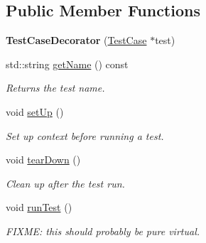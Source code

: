 \subsection*{Public Member Functions}
\begin{DoxyCompactItemize}
\item 
{\bfseries Test\+Case\+Decorator} (\hyperlink{class_test_case}{Test\+Case} $\ast$test)\hypertarget{class_test_case_decorator_ad324bf1dd0d660bae3eb5be8056e49e2}{}\label{class_test_case_decorator_ad324bf1dd0d660bae3eb5be8056e49e2}

\item 
std\+::string \hyperlink{class_test_case_decorator_a5214bb812414958d39f084e09c8af207}{get\+Name} () const 
\begin{DoxyCompactList}\small\item\em Returns the test name. \end{DoxyCompactList}\item 
void \hyperlink{class_test_case_decorator_ae379c8f3e6d411d8a5da57094c08a623}{set\+Up} ()\hypertarget{class_test_case_decorator_ae379c8f3e6d411d8a5da57094c08a623}{}\label{class_test_case_decorator_ae379c8f3e6d411d8a5da57094c08a623}

\begin{DoxyCompactList}\small\item\em Set up context before running a test. \end{DoxyCompactList}\item 
void \hyperlink{class_test_case_decorator_adc3ee82fb758f39b5781624090af449d}{tear\+Down} ()\hypertarget{class_test_case_decorator_adc3ee82fb758f39b5781624090af449d}{}\label{class_test_case_decorator_adc3ee82fb758f39b5781624090af449d}

\begin{DoxyCompactList}\small\item\em Clean up after the test run. \end{DoxyCompactList}\item 
void \hyperlink{class_test_case_decorator_ad083ca55ff2e7f1f3f442364aa1dde66}{run\+Test} ()\hypertarget{class_test_case_decorator_ad083ca55ff2e7f1f3f442364aa1dde66}{}\label{class_test_case_decorator_ad083ca55ff2e7f1f3f442364aa1dde66}

\begin{DoxyCompactList}\small\item\em F\+I\+X\+ME\+: this should probably be pure virtual. \end{DoxyCompactList}\end{DoxyCompactItemize}
